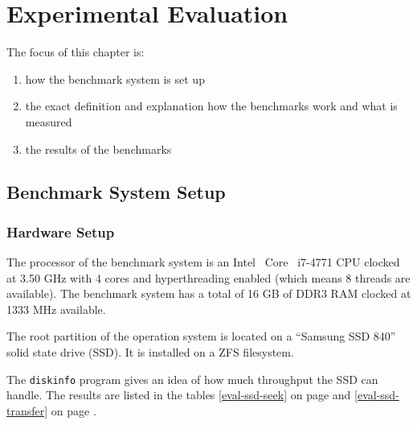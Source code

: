 \chapter{Experimental Evaluation}


The focus of this chapter is:
\begin{enumerate}
\item how the benchmark system is set up
\item the exact definition and explanation how the benchmarks work and what is measured
\item the results of the benchmarks
\end{enumerate}

%

\section{Benchmark System Setup}
  \subsection{Hardware Setup}

The processor of the benchmark system is an Intel\textregistered~ Core\texttrademark~ i7-4771 CPU clocked at 3.50 GHz with 4 cores and hyperthreading enabled (which means 8 threads are available).
The benchmark system has a total of 16 GB of DDR3 RAM clocked at 1333 MHz available.

The root partition of the operation system is located on a ``Samsung SSD 840'' solid state drive (SSD).
It is installed on a ZFS filesystem.

The \texttt{diskinfo} program gives an idea of how much throughput the SSD can handle. The results are listed in the tables \ref{eval-ssd-seek} on page \pageref{eval-ssd-seek} and \ref{eval-ssd-transfer} on page \pageref{eval-ssd-transfer}.

